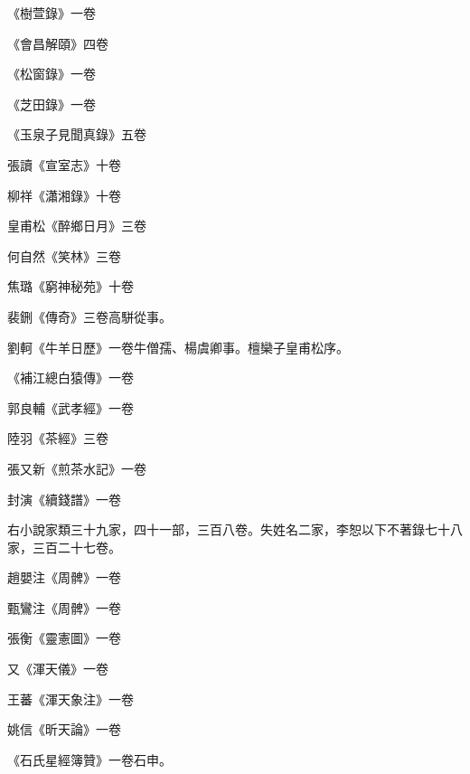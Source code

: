\begin{pinyinscope}
 《樹萱錄》一卷



 《會昌解頤》四卷



 《松窗錄》一卷



 《芝田錄》一卷



 《玉泉子見聞真錄》五卷



 張讀《宣室志》十卷



 柳祥《瀟湘錄》十卷



 皇甫松《醉鄉日月》三卷



 何自然《笑林》三卷



 焦璐《窮神秘苑》十卷



 裴鉶《傳奇》三卷高駢從事。



 劉軻《牛羊日歷》一卷牛僧孺、楊虞卿事。檀欒子皇甫松序。



 《補江總白猿傳》一卷



 郭良輔《武孝經》一卷



 陸羽《茶經》三卷



 張又新《煎茶水記》一卷



 封演《續錢譜》一卷



 右小說家類三十九家，四十一部，三百八卷。失姓名二家，李恕以下不著錄七十八家，三百二十七卷。



 趙嬰注《周髀》一卷



 甄鸞注《周髀》一卷



 張衡《靈憲圖》一卷



 又《渾天儀》一卷



 王蕃《渾天象注》一卷



 姚信《昕天論》一卷



 《石氏星經簿贊》一卷石申。




\end{pinyinscope}
